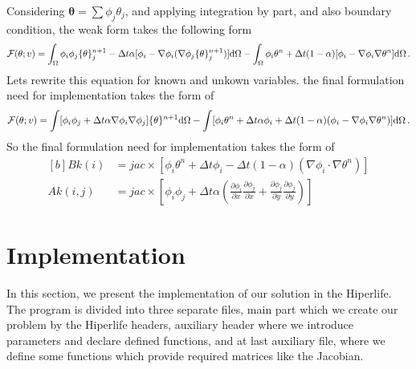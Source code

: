 \documentclass[]{article}
\begin{document}
Considering  $\boldsymbol{\theta} = \sum \phi_j \theta_j$, and applying integration by part, and also boundary condition, the weak form takes the following form
\begin{equation}\label{eq7}
	\begin{aligned}
		\mathcal{F}(\theta; v)=\int_{\Omega} \phi_i \phi_j\{\theta\}^{n+1}_j - \Delta t \alpha [\phi_i - \nabla \phi_i (\nabla \phi_j\{\theta\}^{n+1}_j)] \mathrm{d} \Omega - \int_{\Omega} \phi_i\theta^{n} + \Delta t (1-\alpha) [\phi_i -\nabla \phi_i \nabla\theta^n ] \mathrm{d} \Omega\thinspace.
	\end{aligned}
\end{equation}
Lets rewrite this equation for known and unkown variables. the final formulation need for implementation takes the form of
\begin{equation}\label{eq8}
	\begin{aligned}[b]
		\mathcal{F}(\theta; v)=\int [\phi_i\phi_j + \Delta t \alpha\nabla\phi_i\nabla\phi_j]\{\theta\}^{n+1} \mathrm{d} \Omega - \int  [\phi_i\theta^{n}+\Delta t \alpha \phi_i + \Delta t (1-\alpha) (\phi_i - \nabla \phi_i \nabla\theta^n)]\mathrm{d} \Omega\thinspace.
	\end{aligned}
\end{equation}
So the final formulation need for implementation takes the form of
\begin{equation}\label{eq9}
	\begin{aligned}[b]
		Bk (i) &= jac \times [\phi_i \theta^n + \Delta t  \phi_i - \Delta t (1-\alpha)(\nabla \phi_i \cdot \nabla \theta^n)] \\
		Ak (i,j) &=  jac \times [\phi_i\phi_j + \Delta t \alpha(\frac{\partial \phi_i}{\partial x}
		\frac{\partial \phi_j}{\partial x} + \frac{\partial \phi_j}{\partial y} 
		\frac{\partial \phi_j}{\partial y})]  
	\end{aligned}
\end{equation}
\section{Implementation} \label{sec: imp}
In this section, we present the implementation of our solution in the Hiperlife. The program is divided into three separate files, main part which we create our problem by the Hiperlife headers, auxiliary header where we introduce parameters and declare defined functions, and at last auxiliary file, where we define some functions which provide required matrices like the Jacobian.
\end{document}
